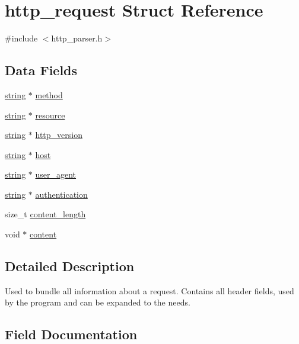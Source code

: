 \hypertarget{structhttp__request}{}\section{http\+\_\+request Struct Reference}
\label{structhttp__request}


{\ttfamily \#include $<$http\+\_\+parser.\+h$>$}

\subsection*{Data Fields}
\begin{DoxyCompactItemize}
\item 
\mbox{\hyperlink{structstring}{string}} $\ast$ \mbox{\hyperlink{structhttp__request_a594173f80b9975fd3ba5394b63ebc509}{method}}
\item 
\mbox{\hyperlink{structstring}{string}} $\ast$ \mbox{\hyperlink{structhttp__request_a09aa4e1a1b2609255ee841c0607d8bea}{resource}}
\item 
\mbox{\hyperlink{structstring}{string}} $\ast$ \mbox{\hyperlink{structhttp__request_aa2fa632b89e408825ab17250da007e81}{http\+\_\+version}}
\item 
\mbox{\hyperlink{structstring}{string}} $\ast$ \mbox{\hyperlink{structhttp__request_a3ef12808a94326450b20b9bc887b4503}{host}}
\item 
\mbox{\hyperlink{structstring}{string}} $\ast$ \mbox{\hyperlink{structhttp__request_a97532af77bd6e59b976a10402660d112}{user\+\_\+agent}}
\item 
\mbox{\hyperlink{structstring}{string}} $\ast$ \mbox{\hyperlink{structhttp__request_a194262fd004e8ec14c9839345a0c3b21}{authentication}}
\item 
size\+\_\+t \mbox{\hyperlink{structhttp__request_a5d3af3f0ffe0a7162b5a69784bb619bc}{content\+\_\+length}}
\item 
void $\ast$ \mbox{\hyperlink{structhttp__request_a3d6d14728fec84498eff595a3e31d15a}{content}}
\end{DoxyCompactItemize}


\subsection{Detailed Description}
Used to bundle all information about a request. Contains all header fields, used by the program and can be expanded to the needs. 

\subsection{Field Documentation}
\mbox{\label{structhttp__request_a194262fd004e8ec14c9839345a0c3b21}} 
